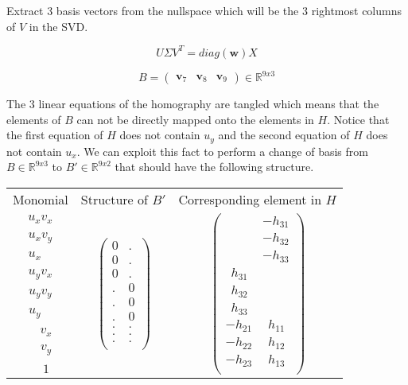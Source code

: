 Extract 3 basis vectors from the nullspace which will be the 3 rightmost columns of $ V $ in the SVD.

\[
U\Sigma V^T = diag(\textbf{w})X
\]


\[
B = 
\begin{pmatrix}
\textbf{v}_7 & \textbf{v}_8 & \textbf{v}_9
\end{pmatrix}
\in \mathbb{R}^{9x3}
\]

The 3 linear equations of the homography are tangled which means that the elements of $B$ can not be directly mapped onto the elements in $H$. Notice that the first equation of $H$ does not contain $u_y$ and the second equation of $H$ does not contain $u_x$. We can exploit this fact to perform a change of basis from $B \in \mathbb{R}^{9x3}$ to $B' \in \mathbb{R}^{9x2}$ that should have the following structure.

\begin{center}
\begin{tabular}{ c c c }
	Monomial & Structure of $B'$ & Corresponding element in $H$ \\
	$u_x v_x$ & \multirow{9}{*}{
$\begin{pmatrix}
	0 & . \\
	0 & . \\
	0 & . \\
	. & 0 \\
	. & 0 \\
	. & 0 \\
	. & . \\
	. & . \\
	. & . \\
\end{pmatrix}$
} & \multirow{9}{*}{
$\begin{pmatrix}
  & -h_{31} \\
  & -h_{32} \\
  & -h_{33} \\
\ \ h_{31} &   \\
\ \ h_{32} &   \\
\ \ h_{33} &   \\
-h_{21} &\ \  h_{11} \\
-h_{22} &\ \  h_{12} \\
-h_{23} &\ \  h_{13} \\
\end{pmatrix}$
} \\
	$u_x v_y$ & \\
	$u_x \ \ \ \ $ & \\    
	\hline
	$u_y v_x$ & \\
	$u_y v_y$ & \\
	$u_y \ \ \ \ $ & \\    
	\hline
	$\ \ \ \ v_x$ & \\
	$\ \ \ \ v_y$ & \\
	$\ \ \ \ 1$ & \\
\end{tabular}
\end{center}

